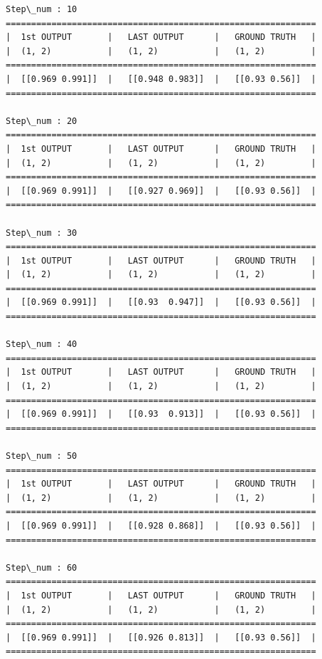 \documentclass[11pt]{article}
\begin{document}
    \begin{Verbatim}[commandchars=\\\{\}]
Step\_num : 10
=============================================================
|  1st OUTPUT       |   LAST OUTPUT      |   GROUND TRUTH   |
|  (1, 2)           |   (1, 2)           |   (1, 2)         |
=============================================================
|  [[0.969 0.991]]  |   [[0.948 0.983]]  |   [[0.93 0.56]]  |
=============================================================

Step\_num : 20
=============================================================
|  1st OUTPUT       |   LAST OUTPUT      |   GROUND TRUTH   |
|  (1, 2)           |   (1, 2)           |   (1, 2)         |
=============================================================
|  [[0.969 0.991]]  |   [[0.927 0.969]]  |   [[0.93 0.56]]  |
=============================================================

Step\_num : 30
=============================================================
|  1st OUTPUT       |   LAST OUTPUT      |   GROUND TRUTH   |
|  (1, 2)           |   (1, 2)           |   (1, 2)         |
=============================================================
|  [[0.969 0.991]]  |   [[0.93  0.947]]  |   [[0.93 0.56]]  |
=============================================================

Step\_num : 40
=============================================================
|  1st OUTPUT       |   LAST OUTPUT      |   GROUND TRUTH   |
|  (1, 2)           |   (1, 2)           |   (1, 2)         |
=============================================================
|  [[0.969 0.991]]  |   [[0.93  0.913]]  |   [[0.93 0.56]]  |
=============================================================

Step\_num : 50
=============================================================
|  1st OUTPUT       |   LAST OUTPUT      |   GROUND TRUTH   |
|  (1, 2)           |   (1, 2)           |   (1, 2)         |
=============================================================
|  [[0.969 0.991]]  |   [[0.928 0.868]]  |   [[0.93 0.56]]  |
=============================================================

Step\_num : 60
=============================================================
|  1st OUTPUT       |   LAST OUTPUT      |   GROUND TRUTH   |
|  (1, 2)           |   (1, 2)           |   (1, 2)         |
=============================================================
|  [[0.969 0.991]]  |   [[0.926 0.813]]  |   [[0.93 0.56]]  |
=============================================================


\end{Verbatim}
\end{document}
